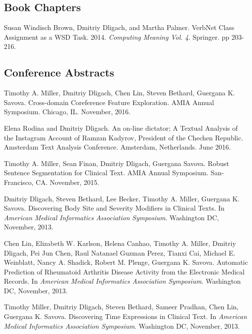 \documentclass[letterpaper]{article}
\renewenvironment{itemize}{
  \begin{list}{}{
    \setlength{\leftmargin}{1.5em}
  }
}{
  \end{list}
}
\begin{document}
\subsection*{Book Chapters}
\begin{itemize}
\item Susan Windisch Brown, Dmitriy Dligach, and Martha Palmer. VerbNet Class Assignment as a WSD Task. 2014. \emph{Computing Meaning Vol. 4}. Springer. pp 203-216.
\end{itemize}

\subsection*{Conference Abstracts}
\begin{itemize}
\item Timothy A. Miller, Dmitriy Dligach, Chen Lin, Steven Bethard, Guergana K. Savova. Cross-domain Coreference Feature Exploration. AMIA Annual Symposium. Chicago, IL. November, 2016.
\item Elena Rodina and Dmitriy Dligach. An on-line dictator; A Textual Analysis of the Instagram Account of Ramzan Kadyrov, President of the Chechen Republic. Amsterdam Text Analysis Conference. Amsterdam, Netherlands. June 2016.
\item Timothy A. Miller, Sean Finan, Dmitriy Dligach, Guergana Savova. Robust Sentence Segmentation for Clinical Text. AMIA Annual Symposium. San-Francisco, CA. November, 2015.
\item Dmitriy Dligach, Steven Bethard, Lee Becker, Timothy A. Miller, Guergana K. Savova. Discovering Body Site and Severity Modifiers in Clinical Texts. In \emph{American Medical Informatics Association Symposium}. Washington DC, November, 2013.
\item Chen Lin, Elizabeth W. Karlson, Helena Canhao, Timothy A. Miller, Dmitriy Dligach, Pei Jun Chen, Raul Natanael Guzman Perez, Tianxi Cai, Michael E. Weinblatt, Nancy A. Shadick, Robert M. Plenge, Guergana K. Savova. Automatic Prediction of Rheumatoid Arthritis Disease Activity from the Electronic Medical Records. In \emph{American Medical Informatics Association Symposium}. Washington DC, November, 2013.
\item Timothy Miller, Dmitriy Dligach, Steven Bethard, Sameer Pradhan, Chen Lin, Guergana K. Savova. Discovering Time Expressions in Clinical Text. In \emph{American Medical Informatics Association Symposium}. Washington DC, November, 2013.
\end{itemize}
\end{document}
